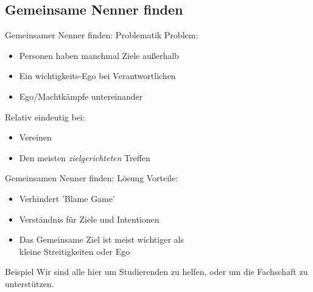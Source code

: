 \subsection{Gemeinsame Nenner finden}
\begin{frame}[c]{Gemeinsamer Nenner finden: Problematik}
    \large
    Problem:
    \begin{itemize}[<+(1)->]
        \item Personen haben manchmal Ziele außerhalb
        \item Ein wichtigkeits-Ego bei Verantwortlichen
        \item Ego/Machtkämpfe untereinander
    \end{itemize}
    \pause
    Relativ eindeutig bei:
    \begin{itemize}[<+(1)->]
        \item Vereinen
        \item Den meisten {\em zielgerichteten} Treffen
    \end{itemize}
\end{frame}

\begin{frame}[c]{Gemeinsamen Nenner finden: Lösung}
    \large
    Vorteile:
    \begin{itemize}[<+(1)->]
        \item Verhindert 'Blame Game'
        \item Verständnis für Ziele und Intentionen
        \item Das Gemeinsame Ziel ist meist wichtiger als \\kleine Streitigkeiten oder Ego
    \end{itemize}
    \vspace{1cm}

    \pause
    \begin{block}{Beispiel}
        Wir sind alle hier um Studierenden zu helfen, oder 
        um die Fachschaft zu unterstützen.
    \end{block}
\end{frame}
